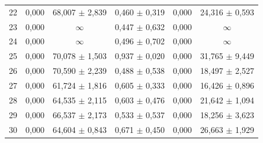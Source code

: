 \begin{tabular}{l c c c c c}
22 & 0,000 & 68,007 $\pm$ 2,839 & 0,460 $\pm$ 0,319 & 0,000 & 24,316 $\pm$ 0,593 \\
23 & 0,000 & $\infty$ & 0,447 $\pm$ 0,632 & 0,000 & $\infty$ \\
24 & 0,000 & $\infty$ & 0,496 $\pm$ 0,702 & 0,000 & $\infty$ \\
25 & 0,000 & 70,078 $\pm$ 1,503 & 0,937 $\pm$ 0,020 & 0,000 & 31,765 $\pm$ 9,449 \\
26 & 0,000 & 70,590 $\pm$ 2,239 & 0,488 $\pm$ 0,538 & 0,000 & 18,497 $\pm$ 2,527 \\
27 & 0,000 & 61,724 $\pm$ 1,816 & 0,605 $\pm$ 0,333 & 0,000 & 16,426 $\pm$ 0,896 \\
28 & 0,000 & 64,535 $\pm$ 2,115 & 0,603 $\pm$ 0,476 & 0,000 & 21,642 $\pm$ 1,094 \\
29 & 0,000 & 66,537 $\pm$ 2,173 & 0,533 $\pm$ 0,537 & 0,000 & 18,256 $\pm$ 3,623 \\
30 & 0,000 & 64,604 $\pm$ 0,843 & 0,671 $\pm$ 0,450 & 0,000 & 26,663 $\pm$ 1,929 \\
\hline 
 \end{tabular}
